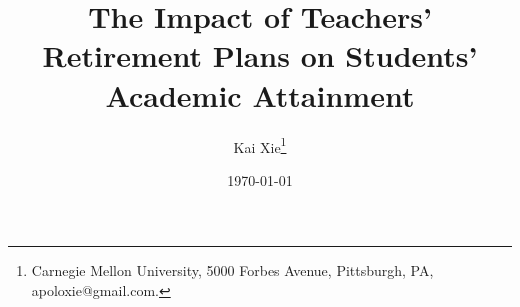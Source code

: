 \documentclass[AER]{AEA}
\begin{document}
\title{The Impact of Teachers' Retirement Plans on Students' Academic Attainment}
\author{Kai Xie\thanks{Carnegie Mellon University, 5000 Forbes Avenue,
Pittsburgh, PA, apoloxie@gmail.com.}}
\date{\today}

\renewcommand{\eqref}[1]{\textup{{\normalfont(\ref{#1}}\normalfont)}}
\newcommand{\kai}[1]{{\color{red} KAI: #1}}
\newcommand{\wolf}[1]{{\color{green} WOLF: #1}}




\maketitle











\appendix


\end{document}
